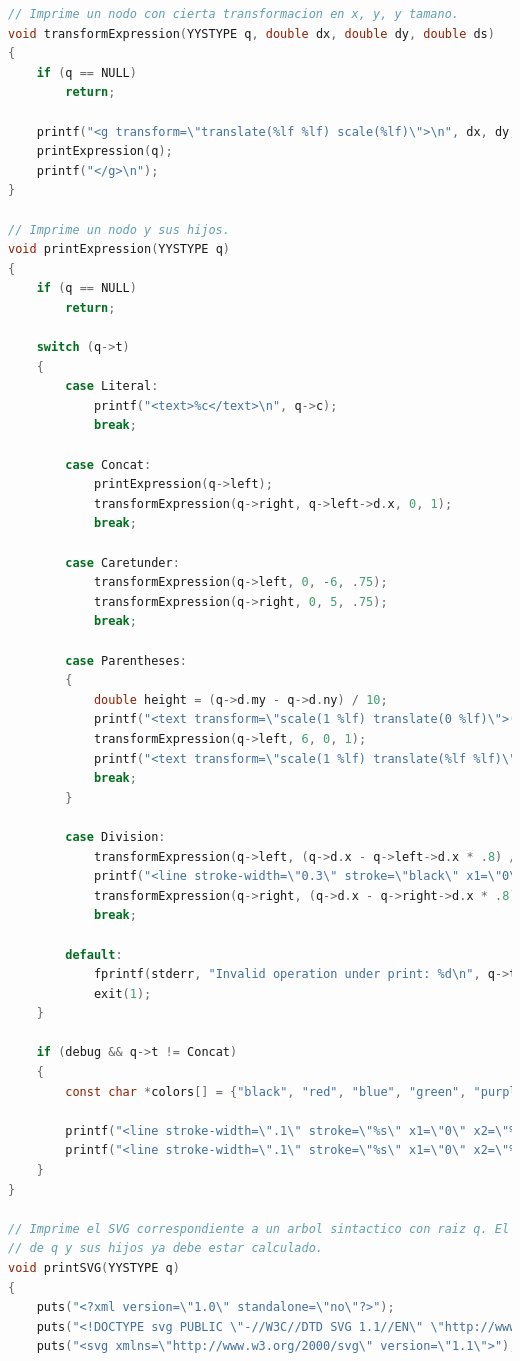 \documentclass[a4paper, 10pt, twoside]{article}
\begin{document}
\begin{lstlisting}[language=C]
// Imprime un nodo con cierta transformacion en x, y, y tamano.
void transformExpression(YYSTYPE q, double dx, double dy, double ds)
{
	if (q == NULL)
		return;

	printf("<g transform=\"translate(%lf %lf) scale(%lf)\">\n", dx, dy, ds);
	printExpression(q);
	printf("</g>\n");
}

// Imprime un nodo y sus hijos.
void printExpression(YYSTYPE q)
{
	if (q == NULL)
		return;

	switch (q->t)
	{
		case Literal:
			printf("<text>%c</text>\n", q->c);
			break;

		case Concat:
			printExpression(q->left);
			transformExpression(q->right, q->left->d.x, 0, 1);
			break;

		case Caretunder:
			transformExpression(q->left, 0, -6, .75);
			transformExpression(q->right, 0, 5, .75);
			break;

		case Parentheses:
		{
			double height = (q->d.my - q->d.ny) / 10;
			printf("<text transform=\"scale(1 %lf) translate(0 %lf)\">(</text>\n", height, height / 2);
			transformExpression(q->left, 6, 0, 1);
			printf("<text transform=\"scale(1 %lf) translate(%lf %lf)\">)</text>\n", height, q->left->d.x + 5, height / 2);
			break;
		}

		case Division:
			transformExpression(q->left, (q->d.x - q->left->d.x * .8) / 2, -q->left->d.my * .8 - 4, .8);
			printf("<line stroke-width=\"0.3\" stroke=\"black\" x1=\"0\" x2=\"%lf\" y1=\"-3\" y2=\"-3\" />\n", q->d.x);
			transformExpression(q->right, (q->d.x - q->right->d.x * .8) / 2, -q->right->d.ny * .8 - 0.5, .8);
			break;

		default:
			fprintf(stderr, "Invalid operation under print: %d\n", q->t);
			exit(1);
	}

	if (debug && q->t != Concat)
	{
		const char *colors[] = {"black", "red", "blue", "green", "purple"};

		printf("<line stroke-width=\".1\" stroke=\"%s\" x1=\"0\" x2=\"%lf\" y1=\"%lf\" y2=\"%lf\" />\n", colors[q->t], q->d.x, q->d.ny, q->d.ny);
		printf("<line stroke-width=\".1\" stroke=\"%s\" x1=\"0\" x2=\"%lf\" y1=\"%lf\" y2=\"%lf\" />\n", colors[q->t], q->d.x, q->d.my, q->d.my);
	}
}

// Imprime el SVG correspondiente a un arbol sintactico con raiz q. El tamano
// de q y sus hijos ya debe estar calculado.
void printSVG(YYSTYPE q)
{
	puts("<?xml version=\"1.0\" standalone=\"no\"?>");
	puts("<!DOCTYPE svg PUBLIC \"-//W3C//DTD SVG 1.1//EN\" \"http://www.w3.org/Graphics/SVG/1.1/DTD/svg11.dtd\">");
	puts("<svg xmlns=\"http://www.w3.org/2000/svg\" version=\"1.1\">");


\end{lstlisting}
\end{document}
